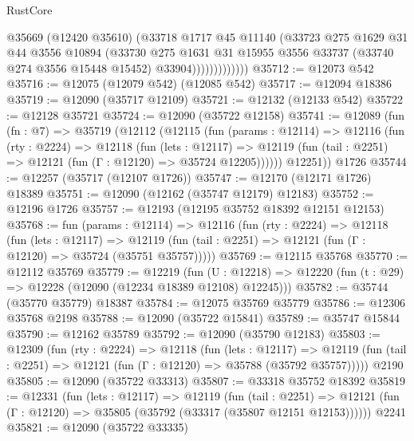 \begin{lexlean}{RustCore}
\begin{coremodule}
                        @35669
                        (@12420 @35610)
                        (@33718
                          @1717
                          @45
                          @11140
                          (@33723
                            @275
                            @1629
                            @31
                            @44
                            @3556
                            @10894
                            (@33730
                              @275
                              @1631
                              @31
                              @15955
                              @3556
                              @33737
                              (@33740 @274 @3556 @15448 @15452)
                              @33904)))))))))))))
@35712 := @12073 @542
@35716 := @12075 (@12079 @542) (@12085 @542)
@35717 := @12094 @18386
@35719 := @12090 (@35717 @12109)
@35721 := @12132 (@12133 @542)
@35722 := @12128 @35721
@35724 := @12090 (@35722 @12158)
@35741 := @12089
    (fun (fn : @7) =>
    @35719
      (@12112
        (@12115
          (fun (params : @12114) =>
          @12116
            (fun (rty : @2224) =>
            @12118
              (fun (lets : @12117) =>
              @12119 (fun (tail : @2251) => @12121 (fun (Γ : @12120) => @35724 @12205))))))
        @12251))
    @1726
@35744 := @12257 (@35717 (@12107 @1726))
@35747 := @12170 (@12171 @1726) @18389
@35751 := @12090 (@12162 (@35747 @12179) @12183)
@35752 := @12196 @1726
@35757 := @12193 (@12195 @35752 @18392 @12151 @12153)
@35768 := fun (params : @12114) =>
  @12116
    (fun (rty : @2224) =>
    @12118
      (fun (lets : @12117) =>
      @12119 (fun (tail : @2251) => @12121 (fun (Γ : @12120) => @35724 (@35751 @35757)))))
@35769 := @12115 @35768
@35770 := @12112 @35769
@35779 := @12219
    (fun (U : @12218) => @12220 (fun (t : @29) => @12228 (@12090 (@12234 @18389 @12108) @12245)))
@35782 := @35744 (@35770 @35779) @18387
@35784 := @12075 @35769 @35779
@35786 := @12306 @35768 @2198
@35788 := @12090 (@35722 @15841)
@35789 := @35747 @15844
@35790 := @12162 @35789
@35792 := @12090 (@35790 @12183)
@35803 := @12309
    (fun (rty : @2224) =>
    @12118
      (fun (lets : @12117) =>
      @12119 (fun (tail : @2251) => @12121 (fun (Γ : @12120) => @35788 (@35792 @35757)))))
    @2190
@35805 := @12090 (@35722 @33313)
@35807 := @33318 @35752 @18392
@35819 := @12331
    (fun (lets : @12117) =>
    @12119
      (fun (tail : @2251) =>
      @12121 (fun (Γ : @12120) => @35805 (@35792 (@33317 (@35807 @12151 @12153))))))
    @2241
@35821 := @12090 (@35722 @33335)

\end{coremodule}
\end{lexlean}
